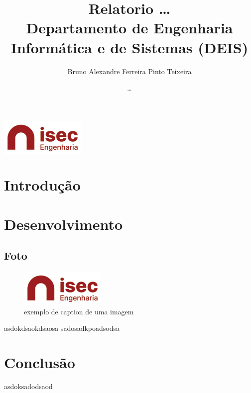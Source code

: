 \documentclass[letterpaper, 11pt]{article}
\author{Bruno Alexandre Ferreira Pinto Teixeira}
\date{\ldots{}}
\title{Relatorio \ldots{}\\\medskip
\large Departamento de Engenharia Informática e de Sistemas (DEIS)}
\begin{document}
\maketitle
\begin{center}
\includegraphics[width=5 cm]{images/isec.png}
\end{center}

\clearpage
\tableofcontents
\clearpage

\listoffigures
\clearpage

\section{Introdução}
\label{sec:orgb14feb3}
\section{Desenvolvimento}
\label{sec:org5ef8640}
\subsection{Foto}
\label{sec:org9022fa4}
\begin{figure}[htbp]
\centering
\includegraphics[width=.9\linewidth]{images/isec.png}
\caption{\label{fig:org725553e}
exemplo de caption de uma imagem}
\end{figure}

asdokdsaokdsaosa
sadosadkpoadsodsa

\section{Conclusão}
\label{sec:org08332f5}
asdoksadodsaod
\end{document}
